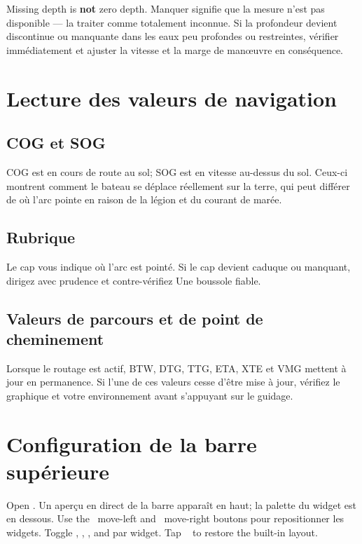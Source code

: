 \begin{warningbox}
Missing depth is \textbf{not} zero depth.
Manquer signifie que la mesure n'est pas disponible --- la traiter comme totalement inconnue.
Si la profondeur devient discontinue ou manquante dans les eaux peu profondes ou restreintes, vérifier
immédiatement et ajuster la vitesse et la marge de manœuvre en conséquence.
\end{warningbox}

\section{Lecture des valeurs de navigation}

\subsection{COG et SOG}

COG est en cours de route au sol; SOG est en vitesse au-dessus du sol.
Ceux-ci montrent comment le bateau se déplace réellement sur la terre, qui peut différer de
où l'arc pointe en raison de la légion et du courant de marée.

\subsection{Rubrique}

Le cap vous indique où l'arc est pointé.
Si le cap devient caduque ou manquant, dirigez avec prudence et contre-vérifiez
Une boussole fiable.

\subsection{Valeurs de parcours et de point de cheminement}

Lorsque le routage est actif, BTW, DTG, TTG, ETA, XTE et VMG mettent à jour en permanence.
Si l'une de ces valeurs cesse d'être mise à jour, vérifiez le graphique et votre environnement avant
s'appuyant sur le guidage.

\section{Configuration de la barre supérieure}

Open .
Un aperçu en direct de la barre apparaît en haut; la palette du widget est en dessous.
Use the ~move-left and ~move-right
boutons pour repositionner les widgets.
Toggle , , , and 
par widget.
Tap ~ to restore the built-in layout.

